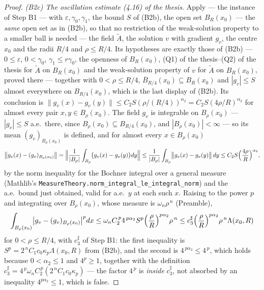 \begin{proof}
\emph{(B2c) The oscillation estimate (4.16) of the thesis.}  Apply
 --- the instance of Step B1 --- with
$\varepsilon,\gamma_0,\gamma_1$, the bound $S$ of (B2b), the open set
$B_R(x_0)$ --- the \emph{same} open set as in (B2b), so that no restriction of
the weak-solution property to a smaller ball is needed --- the field
$\widetilde A$, the solution $v$ with gradient $g_v$, the centre $x_0$ and the
radii $R/4$ and $\rho\le R/4$.  Its hypotheses are exactly those of (B2b) ---
$0\le\varepsilon$, $0<\gamma_0$, $\gamma_1\le r\gamma_0$, the openness of
$B_R(x_0)$, (Q1) of the thesis--(Q2) of the thesis for $\widetilde A$ on $B_R(x_0)$ and
the weak-solution property of $v$ for $\widetilde A$ on $B_R(x_0)$, proved
there --- together with $0<\rho\le R/4$,
$\overline B_{R/4}(x_0)\subseteq B_R(x_0)$ and $|g_v|\le S$ almost everywhere on
$B_{R/4}(x_0)$, which is the last display of (B2b).  Its conclusion is
$\|g_v(x)-g_v(y)\|\le C_2S(\rho/(R/4))^{\alpha_2}=C_2S(4\rho/R)^{\alpha_2}$ for
almost every pair $x,y\in B_\rho(x_0)$.  The field $g_v$ is integrable on
$B_\rho(x_0)$ --- $|g_v|\le S$ a.e.\ there, since
$B_\rho(x_0)\subseteq B_{R/4}(x_0)$, and $|B_\rho(x_0)|<\infty$ --- so its mean
$(g_v)_{B_\rho(x_0)}$ is defined, and for almost every $x\in B_\rho(x_0)$
\[
\bigl\|g_v(x)-(g_v)_{B_\rho(x_0)}\bigr\|
=\Bigl\|\frac1{|B_\rho|}\int_{B_\rho}\bigl(g_v(x)-g_v(y)\bigr)dy\Bigr\|
\le\frac1{|B_\rho|}\int_{B_\rho}\bigl\|g_v(x)-g_v(y)\bigr\|\,dy
\le C_2S\Bigl(\frac{4\rho}R\Bigr)^{\alpha_2},
\]
by the norm inequality for the Bochner integral over a general measure
(Mathlib's \texttt{MeasureTheory.norm\_integral\_le\_integral\_norm}) and the
a.e.\ bound just obtained, valid for a.e.\ $y$ at each such $x$.  Raising to the
power $p$ and integrating over $B_\rho(x_0)$, whose measure is
$\omega_n\rho^{\,n}$ (Preamble),
\[
\int_{B_\rho(x_0)}\bigl|g_v-(g_v)_{B_\rho(x_0)}\bigr|^p dx
\le\omega_nC_2^{\,p}4^{\,p\alpha_2}S^{p}\Bigl(\frac\rho R\Bigr)^{p\alpha_2}\rho^{\,n}
\le c_3^{\sharp}\Bigl(\frac\rho R\Bigr)^{p\alpha_2}\rho^{\,n}\Lambda(x_0,R)
\]
for $0<\rho\le R/4$, with $c_3^{\sharp}$ of Step B1: the first inequality is
$S^{p}=2^{\,n}C_1c_0\kappa_p\Lambda(x_0,R)$ from (B2b), and the second is
$4^{\,p\alpha_2}\le4^{\,p}$, which holds because $0<\alpha_2\le1$ and $4^p\ge1$,
together with the definition
$c_3^{\sharp}=4^{\,p}\omega_nC_2^{\,p}(2^{\,n}C_1c_0\kappa_p)$ --- the factor
$4^{\,p}$ is \emph{inside} $c_3^{\sharp}$, not absorbed by an inequality
$4^{p\alpha_2}\le1$, which is false.


\end{proof}
